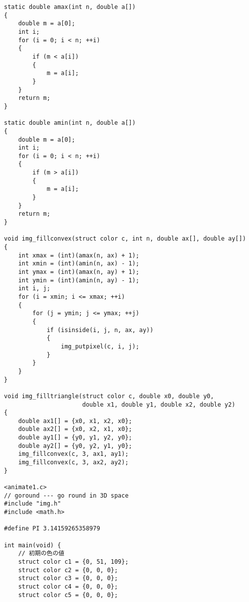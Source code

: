 \documentclass[12pt,a4j]{jarticle}
\begin{document}
\begin{verbatim}
static double amax(int n, double a[])
{
    double m = a[0];
    int i;
    for (i = 0; i < n; ++i)
    {
        if (m < a[i])
        {
            m = a[i];
        }
    }
    return m;
}

static double amin(int n, double a[])
{
    double m = a[0];
    int i;
    for (i = 0; i < n; ++i)
    {
        if (m > a[i])
        {
            m = a[i];
        }
    }
    return m;
}

void img_fillconvex(struct color c, int n, double ax[], double ay[])
{
    int xmax = (int)(amax(n, ax) + 1);
    int xmin = (int)(amin(n, ax) - 1);
    int ymax = (int)(amax(n, ay) + 1);
    int ymin = (int)(amin(n, ay) - 1);
    int i, j;
    for (i = xmin; i <= xmax; ++i)
    {
        for (j = ymin; j <= ymax; ++j)
        {
            if (isinside(i, j, n, ax, ay))
            {
                img_putpixel(c, i, j);
            }
        }
    }
}

void img_filltriangle(struct color c, double x0, double y0, 
                      double x1, double y1, double x2, double y2)
{
    double ax1[] = {x0, x1, x2, x0};
    double ax2[] = {x0, x2, x1, x0};
    double ay1[] = {y0, y1, y2, y0};
    double ay2[] = {y0, y2, y1, y0};
    img_fillconvex(c, 3, ax1, ay1);
    img_fillconvex(c, 3, ax2, ay2);
}

<animate1.c>
// goround --- go round in 3D space
#include "img.h"
#include <math.h>

#define PI 3.14159265358979

int main(void) {
    // 初期の色の値
    struct color c1 = {0, 51, 109};
    struct color c2 = {0, 0, 0};
    struct color c3 = {0, 0, 0};
    struct color c4 = {0, 0, 0};
    struct color c5 = {0, 0, 0};


\end{verbatim}
\end{document}
